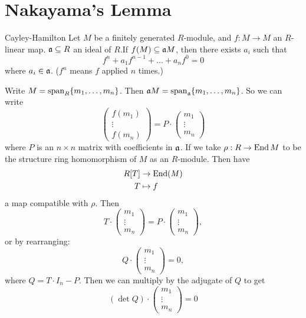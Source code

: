 \documentclass{article}
\begin{document}
\section{Nakayama's Lemma}
\begin{fancyprop}{Cayley-Hamilton}
    Let $M$ be a finitely generated $R$-module, and $f:M \to M$ an $R$-linear map. $\mathfrak{a} \subseteq R$ an ideal of $R$.\gap If $f(M) \subseteq \mathfrak{a} M$, then there exists $a_{i}$ such that \[ f^{n} + a_{1}f^{n-1} + \dots + a_{n}f^{0} = 0\]
    where $a_{i} \in \mathfrak{a}$. ($f^{n}$ means $f$ applied $n$ times.) 
\end{fancyprop}
Write $M = \operatorname{span}_{R}\{m_{1}, \dots, m_{n}\}$. Then $\mathfrak{a} M = \operatorname{span}_{\mathfrak{a}}\{m_{1}, \dots, m_{n}\}$. So we can write \[ \begin{pmatrix}
    f(m_{1})\\
    \vdots\\
    f(m_{n})
\end{pmatrix} = P \cdot \begin{pmatrix}
    m_{1}\\ 
    \vdots\\
    m_{n}
\end{pmatrix}\] 
where $P$ is an $n\times n$ matrix with coefficients in $\mathfrak{a}$. If we take $\rho : R \to \operatorname{End} M$ to be the structure ring homomorphism of $M$ as an $R$-module. Then have \begin{align*}
     R[T] &\to \operatorname{End}(M)\\ 
     T &\mapsto f
\end{align*} a map compatible with $\rho$. Then \[ T \cdot \begin{pmatrix}
    m_{1}\\
    \vdots\\
    m_{n}
\end{pmatrix} = P \cdot \begin{pmatrix}
    m_{1}\\
    \vdots\\
    m_{n}
\end{pmatrix},\]
or by rearranging: \[ Q \cdot \begin{pmatrix}
    m_{1}\\
    \vdots\\
    m_{n}
\end{pmatrix} = 0,\]
where $Q = T\cdot I_{n} -P$. Then we can multiply by the adjugate of $Q$ to get \[ (\det Q) \cdot \begin{pmatrix}
    m_{1}\\
    \vdots\\
    m_{n}
\end{pmatrix} = 0\] 
\end{document}

